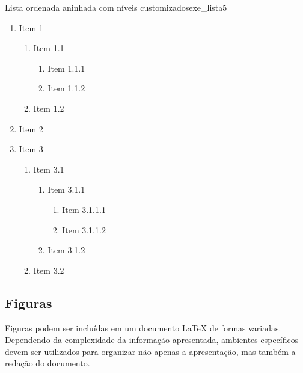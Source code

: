 \begingroup
\begin{texexptitled}[breakable,enhanced,middle=2mm]{Lista ordenada aninhada com níveis customizados}{exe_lista5}
\renewcommand{\labelenumi}{\Alph{enumi}.}
\renewcommand{\labelenumii}{\roman{enumii}.}
\renewcommand{\labelenumiii}{(\alph{enumiii})}
\renewcommand{\labelenumiv}{\arabic{enumiv}.}
\begin{enumerate}
    \item Item 1
    \begin{enumerate}
        \item Item 1.1
        \begin{enumerate}
            \item Item 1.1.1
            \item Item 1.1.2
        \end{enumerate}
        \item Item 1.2
    \end{enumerate}
    \item Item 2
    \item Item 3
    \begin{enumerate}
        \item Item 3.1
         \begin{enumerate}
            \item Item 3.1.1
            \begin{enumerate}
                \item Item 3.1.1.1
                \item Item 3.1.1.2
            \end{enumerate}
            \item Item 3.1.2
        \end{enumerate}
        \item Item 3.2
    \end{enumerate}
\end{enumerate}
\end{texexptitled}
\endgroup

\subsection{Figuras}
\label{sec:figuras}

Figuras podem ser incluídas em um documento \LaTeX{} de formas variadas. Dependendo da complexidade da informação apresentada, ambientes específicos devem ser utilizados para organizar não apenas a apresentação, mas também a redação do documento.

